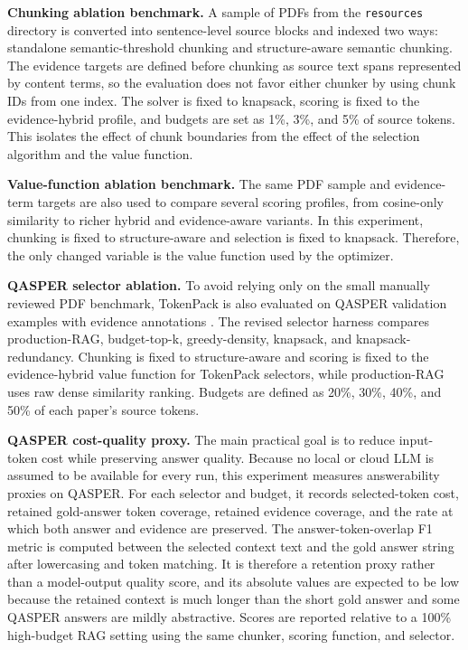 \documentclass[conference]{IEEEtran}
\begin{document}
\textbf{Chunking ablation benchmark.} A sample of PDFs from the \texttt{resources} directory is converted into sentence-level source blocks and indexed two ways: standalone semantic-threshold chunking and structure-aware semantic chunking. The evidence targets are defined before chunking as source text spans represented by content terms, so the evaluation does not favor either chunker by using chunk IDs from one index. The solver is fixed to knapsack, scoring is fixed to the evidence-hybrid profile, and budgets are set as 1\%, 3\%, and 5\% of source tokens. This isolates the effect of chunk boundaries from the effect of the selection algorithm and the value function.

\textbf{Value-function ablation benchmark.} The same PDF sample and evidence-term targets are also used to compare several scoring profiles, from cosine-only similarity to richer hybrid and evidence-aware variants. In this experiment, chunking is fixed to structure-aware and selection is fixed to knapsack. Therefore, the only changed variable is the value function used by the optimizer.

\textbf{QASPER selector ablation.} To avoid relying only on the small manually reviewed PDF benchmark, TokenPack is also evaluated on QASPER validation examples with evidence annotations \cite{dasigi2021qasper}. The revised selector harness compares production-RAG, budget-top-k, greedy-density, knapsack, and knapsack-redundancy. Chunking is fixed to structure-aware and scoring is fixed to the evidence-hybrid value function for TokenPack selectors, while production-RAG uses raw dense similarity ranking. Budgets are defined as 20\%, 30\%, 40\%, and 50\% of each paper's source tokens.

\textbf{QASPER cost-quality proxy.} The main practical goal is to reduce input-token cost while preserving answer quality. Because no local or cloud LLM is assumed to be available for every run, this experiment measures answerability proxies on QASPER. For each selector and budget, it records selected-token cost, retained gold-answer token coverage, retained evidence coverage, and the rate at which both answer and evidence are preserved. The answer-token-overlap F1 metric is computed between the selected context text and the gold answer string after lowercasing and token matching. It is therefore a retention proxy rather than a model-output quality score, and its absolute values are expected to be low because the retained context is much longer than the short gold answer and some QASPER answers are mildly abstractive. Scores are reported relative to a 100\% high-budget RAG setting using the same chunker, scoring function, and selector.
\end{document}
